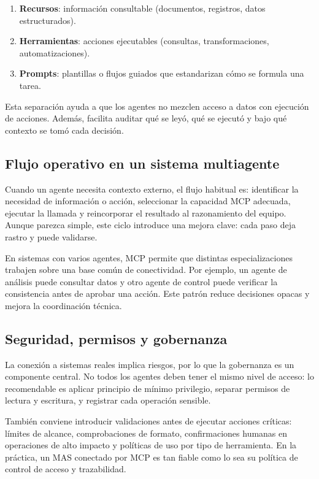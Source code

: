 \documentclass[12pt,a4paper]{article}
\begin{document}
\begin{enumerate}
    \item \textbf{Recursos}: información consultable (documentos, registros, datos estructurados).
    \item \textbf{Herramientas}: acciones ejecutables (consultas, transformaciones, automatizaciones).
    \item \textbf{Prompts}: plantillas o flujos guiados que estandarizan cómo se formula una tarea.
\end{enumerate}

Esta separación ayuda a que los agentes no mezclen acceso a datos con ejecución de acciones. Además, facilita auditar qué se leyó, qué se ejecutó y bajo qué contexto se tomó cada decisión.

\subsection{Flujo operativo en un sistema multiagente}

Cuando un agente necesita contexto externo, el flujo habitual es: identificar la necesidad de información o acción, seleccionar la capacidad MCP adecuada, ejecutar la llamada y reincorporar el resultado al razonamiento del equipo. Aunque parezca simple, este ciclo introduce una mejora clave: cada paso deja rastro y puede validarse.

En sistemas con varios agentes, MCP permite que distintas especializaciones trabajen sobre una base común de conectividad. Por ejemplo, un agente de análisis puede consultar datos y otro agente de control puede verificar la consistencia antes de aprobar una acción. Este patrón reduce decisiones opacas y mejora la coordinación técnica.

\subsection{Seguridad, permisos y gobernanza}

La conexión a sistemas reales implica riesgos, por lo que la gobernanza es un componente central. No todos los agentes deben tener el mismo nivel de acceso: lo recomendable es aplicar principio de mínimo privilegio, separar permisos de lectura y escritura, y registrar cada operación sensible.

También conviene introducir validaciones antes de ejecutar acciones críticas: límites de alcance, comprobaciones de formato, confirmaciones humanas en operaciones de alto impacto y políticas de uso por tipo de herramienta. En la práctica, un MAS conectado por MCP es tan fiable como lo sea su política de control de acceso y trazabilidad.
\end{document}
